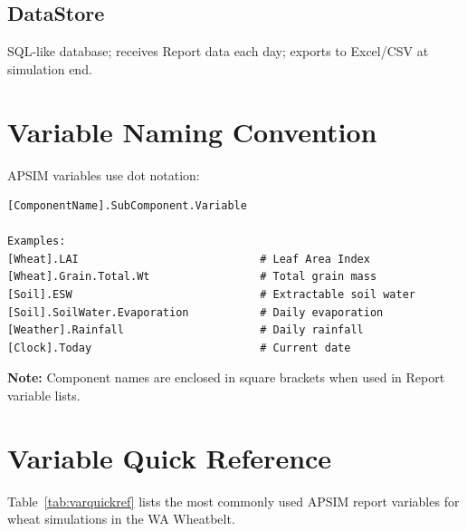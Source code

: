 \subsection{DataStore}

 SQL-like database; receives Report data each day; exports to Excel/CSV at simulation end.

\section{Variable Naming Convention}

APSIM variables use dot notation:

\begin{verbatim}
[ComponentName].SubComponent.Variable

Examples:
[Wheat].LAI                            # Leaf Area Index
[Wheat].Grain.Total.Wt                 # Total grain mass
[Soil].ESW                             # Extractable soil water
[Soil].SoilWater.Evaporation           # Daily evaporation
[Weather].Rainfall                     # Daily rainfall
[Clock].Today                          # Current date
\end{verbatim}

\textbf{Note:} Component names are enclosed in square brackets when used in Report variable lists.

\section{Variable Quick Reference}

Table~\ref{tab:varquickref} lists the most commonly used APSIM report variables for wheat simulations in the WA Wheatbelt.

